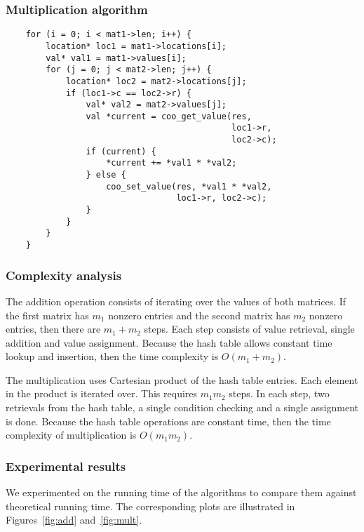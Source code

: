 \documentclass[portrait,a0]{sciposter}
\theoremstyle{definition}\newtheorem{definition}{Definition}
\theoremstyle{plain}\newtheorem{example}{Example}
\theoremstyle{plain} \newtheorem{theorem}{Theorem}
\begin{document}
\begin{multicols}{2}
    \subsubsection{Multiplication algorithm}

    \begin{verbatim}
    for (i = 0; i < mat1->len; i++) {
        location* loc1 = mat1->locations[i];        
        val* val1 = mat1->values[i];
        for (j = 0; j < mat2->len; j++) {
            location* loc2 = mat2->locations[j];
            if (loc1->c == loc2->r) {
                val* val2 = mat2->values[j];
                val *current = coo_get_value(res,
                                             loc1->r,
                                             loc2->c);
                if (current) {
                    *current += *val1 * *val2;
                } else {
                    coo_set_value(res, *val1 * *val2,
                                  loc1->r, loc2->c);
                }
            }
        }
    }

    \end{verbatim}

    \subsubsection{Complexity analysis}

    The addition operation consists of iterating over the values of both
    matrices. If the first matrix has $m_1$ nonzero entries and the second
    matrix has $m_2$ nonzero entries, then there are $m_1 + m_2$ steps. Each
    step consists of value retrieval, single addition and value assignment.
    Because the hash table allows constant time lookup and insertion, then the
    time complexity is $O(m_1+m_2)$.

    The multiplication uses Cartesian product of the hash table entries. Each
    element in the product is iterated over. This requires $m_1 m_2$ steps. In
    each step, two retrievals from the hash table, a single condition
    checking and a single assignment is done. Because the hash table operations
    are constant time, then the time complexity of multiplication is $O(m_1
    m_2)$.

    \subsubsection{Experimental results}

    We experimented on the running time of the algorithms to compare them
    against theoretical running time. The corresponding plots are illustrated in
    Figures~\ref{fig:add} and~\ref{fig:mult}.


\end{multicols}
\end{document}
